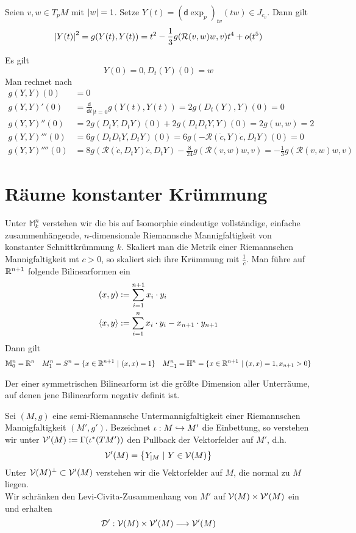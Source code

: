 \documentclass{article}
\renewcommand{\d}{\textsf{d}}
\renewcommand{\M}{\mathbb{M}}
\newcommand{\Rc}{\mathcal{R}}
\begin{document}
\Prop{}
Seien $v,w \in T_pM$ mit $\left|w\right| = 1$. Setze $Y(t) = (\d \exp_p)_{tv}(tw) \in J_{c_v}$. Dann gilt
\[ \bet{Y(t)}^2 = g(Y(t), Y(t)) = t^2 - \frac{1}{3} g(\Rc(v,w)w, v)t^4 + o(t^5) \]

\begin{Beweis}{}
Es gilt
\[ Y(0) = 0, D_t(Y)(0) = w \]
Man rechnet nach
\begin{align*}
	g(Y,Y)(0)     & = 0                                                                    \\
	g(Y,Y)'(0)    & = \frac{\d}{\d t}_{|t = 0} g(Y(t), Y(t)) = 2g(D_t(Y),Y) (0) = 0        \\
	g(Y,Y)''(0)   & = 2g(D_tY, D_tY)(0) + 2g(D_tD_tY,Y)(0) = 2g(w,w) = 2                   \\
	g(Y,Y)'''(0)  & = 6g(D_tD_tY, D_tY)(0) = 6g(-\Rc(\dot{c}, Y) \dot{c}, D_t Y ) (0) = 0  \\
	g(Y,Y)''''(0) & = 8g(\Rc(\dot{c}, D_tY )\dot{c}, D_tY  ) - \frac{8}{24} g(\Rc(v,w)w,v) = - \frac{1}{3}g(\Rc(v,w)w,v)
\end{align*}
\end{Beweis}

\newpage
\section{Räume konstanter Krümmung}
\Def{}
Unter $\M_k^n$ verstehen wir die bis auf Isomorphie eindeutige vollständige, einfache zusammenhängende, $n$-dimensionale Riemannsche Mannigfaltigkeit von konstanter Schnittkrümmung $k$.
\Bem{}
Skaliert man die Metrik einer Riemannschen Mannigfaltigkeit mt $c > 0$, so skaliert sich ihre Krümmung mit $\frac{1}{c}$.
\Bsp{}
Man führe auf $\mathbb{R}^{n+1}$ folgende Bilinearformen ein
\begin{align*}
(x,y) &:= \sum_{i = 1}^{n+1}x_i \cdot y_i\\
\left<x,y\right> &:= \sum_{i = 1}^{n}x_i \cdot y_i - x_{n+1} \cdot y_{n+1}\\
\end{align*}
Dann gilt
\begin{align*}
\M_0^n = \R^n && M_1^n = S^n = \{x \in \R^{n+1} ~|~ (x,x) = 1\} && M_{-1}^n = \H^n = \{ x \in \R^{n+1} ~|~ (x,x) = 1, x_{n+1} > 0 \} 
\end{align*}

\Def{}
Der  einer symmetrischen Bilinearform ist die größte Dimension aller Unterräume, auf denen jene Bilinearform negativ definit ist.

\Def{}
Sei $(M,g)$ eine semi-Riemannsche Untermannigfaltigkeit einer Riemannschen Mannigfaltigkeit $(M',g')$. Bezeichnet $\iota : M \overset{}{\hookrightarrow} M'$ die Einbettung, so verstehen wir unter $\mathcal{V}'(M) := \Gamma(\iota^*(TM'))$ den Pullback der Vektorfelder auf $M'$, d.h.
\[ \V'(M) = \set{Y_{|M}}{Y \in \V(M)} \]
Unter $\mathcal{V}(M)^\bot \subset \mathcal{V}'(M)$ verstehen wir die Vektorfelder auf $M$, die normal zu $M$ liegen.\\
Wir schränken den Levi-Civita-Zusammenhang von $M'$ auf $\mathcal{V}(M) \times \mathcal{V}'(M)$ ein und erhalten
\[ \mathcal{D}' : \mathcal{V}(M) \times \mathcal{V}'(M) \overset{}{\longrightarrow} \mathcal{V}'(M) \]
\end{document}
